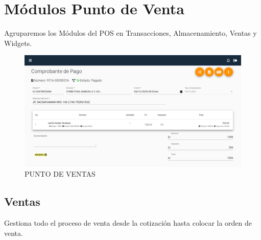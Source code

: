 \documentclass[pdftex,12pt,oneside,a4paper,spanish, english, brazil]{abntex2}
\begin{document}
\begin{sloppypar}
            \chapter{Módulos Punto de Venta}
           	Agruparemos los Módulos del POS en Transacciones, Almacenamiento, Ventas y Widgets.
           	     \begin{figure}[h!]
           		\centering
           		\caption{PUNTO DE VENTAS} \label{fig:maia}
           		\includegraphics[width=0.6\linewidth,frame=0.5pt 5pt]{img/PV}
           	\end{figure}
              \section{Ventas}
              Gestiona todo el proceso de venta desde la cotización hasta colocar la orden de venta.

\end{sloppypar}
\end{document}
